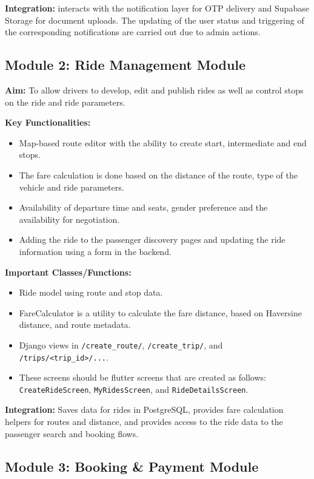 \textbf{Integration:} interacts with the notification layer for OTP delivery and Supabase Storage for document uploads. The updating of the user status and triggering of the corresponding notifications are carried out due to admin actions.

\subsection{Module 2: Ride Management Module}

\textbf{Aim:} To allow drivers to develop, edit and publish rides as well as control stops on the ride and ride parameters.

\textbf{Key Functionalities:}
\begin{itemize}
    \item Map-based route editor with the ability to create start, intermediate and end stops.
    \item The fare calculation is done based on the distance of the route, type of the vehicle and ride parameters.
    \item Availability of departure time and seats, gender preference and the availability for negotiation.
    \item Adding the ride to the passenger discovery pages and updating the ride information using a form in the backend.
\end{itemize}

\textbf{Important Classes/Functions:}
\begin{itemize}
    \item Ride model using route and stop data.
    \item FareCalculator is a utility to calculate the fare distance, based on Haversine distance, and route metadata.
    \item Django views in \texttt{/create\_route/}, \texttt{/create\_trip/}, and \texttt{/trips/<trip\_id>/...}.
    \item These screens should be flutter screens that are created as follows: \texttt{CreateRideScreen}, \texttt{MyRidesScreen}, and \texttt{RideDetailsScreen}.
\end{itemize}

\textbf{Integration:} Saves data for rides in PostgreSQL, provides fare calculation helpers for routes and distance, and provides access to the ride data to the passenger search and booking flows.

\subsection{Module 3: Booking \& Payment Module}

